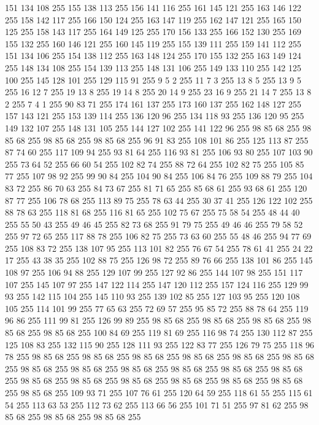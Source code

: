 151 134 108 255 155 138 113 255 156 141 116 255 161 145 121 255 163 146 122 255 158 142 117 255 166 150 124 255 163 147 119 255 162 147 121 255 165 150 125 255 158 143 117 255 164 149 125 255 170 156 133 255 166 152 130 255 169 155 132 255 160 146 121 255 160 145 119 255 155 139 111 255 159 141 112 255 151 134 106 255 154 138 112 255 163 148 124 255 170 155 132 255 163 149 124 255 148 134 108 255 154 139 113 255 148 131 106 255 149 133 110 255 142 125 100 255 145 128 101 255 129 115 91 255 9 5 2 255 11 7 3 255 13 8 5 255 13 9 5 255 16 12 7 255 19 13 8 255 19 14 8 255 20 14 9 255 23 16 9 255 21 14 7 255 13 8 2 255 7 4 1 255 90 83 71 255 174 161 137 255 173 160 137 255 162 148 127 255 157 143 121 255 153 139 114 255 136 120 96 255 134 118 93 255 136 120 95 255 149 132 107 255 148 131 105 255 144 127 102 255 141 122 96 255 98 85 68 255 98 85 68 255 98 85 68 255 98 85 68 255 96 91 83 255 108 101 86 255 125 113 87 255 87 74 60 255
117 109 94 255 93 81 64 255 116 93 81 255 106 93 80 255 107 103 90 255 73 64 52 255 66 60 54 255 102 82 74 255 88 72 64 255 102 82 75 255 105 85 77 255 107 98 92 255 99 90 84 255 104 90 84 255 106 84 76 255 109 88 79 255 104 83 72 255 86 70 63 255 84 73 67 255 81 71 65 255 85 68 61 255 93 68 61 255 120 87 77 255 106 78 68 255 113 89 75 255 78 63 44 255 30 37 41 255 126 122 102 255 88 78 63 255 118 81 68 255 116 81 65 255 102 75 67 255 75 58 54 255 48 44 40 255 55 50 43 255 49 46 45 255 82 73 68 255 91 79 75 255 49 46 46 255 79 58 52 255 97 72 65 255 117 88 78 255 106 82 75 255 73 63 60 255 55 48 46 255 94 77 69 255 108 83 72 255 138 107 95 255 113 101 82 255 76 67 54 255 78 61 41 255 24 22 17 255 43 38 35 255 102 88 75 255 126 98 72 255 89 76 66 255 138 101 86 255 145 108 97 255 106 94 88 255 129 107 99 255 127 92 86 255 144 107 98 255 151 117 107 255 145 107 97 255
147 122 114 255 147 120 112 255 157 124 116 255 129 99 93 255 142 115 104 255 145 110 93 255 139 102 85 255 127 103 95 255 120 108 105 255 114 101 99 255 77 65 63 255 72 69 57 255 95 85 72 255 88 78 64 255 119 96 86 255 111 99 81 255 126 99 89 255 98 85 68 255 98 85 68 255 98 85 68 255 98 85 68 255 98 85 68 255 100 84 69 255 119 81 69 255 116 98 74 255 130 112 87 255 125 108 83 255 132 115 90 255 128 111 93 255 122 83 77 255 126 79 75 255 118 96 78 255 98 85 68 255 98 85 68 255 98 85 68 255 98 85 68 255 98 85 68 255 98 85 68 255 98 85 68 255 98 85 68 255 98 85 68 255 98 85 68 255 98 85 68 255 98 85 68 255 98 85 68 255 98 85 68 255 98 85 68 255 98 85 68 255 98 85 68 255 98 85 68 255 98 85 68 255 109 93 71 255 107 76 61 255 120 64 59 255 118 61 55 255 115 61 54 255 113 63 53 255 112 73 62 255 113 66 56 255 101 71 51 255 97 81 62 255 98 85 68 255 98 85 68 255 98 85 68 255
